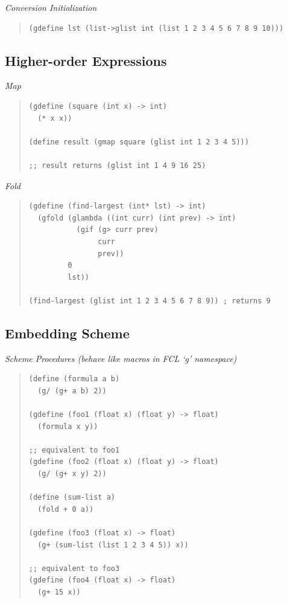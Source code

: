 \documentclass{article}
\begin{document}
\raggedright{} {
{\emph{Conversion Initialization}}
}

\begin{quote}
\begin{verbatim}
(gdefine lst (list->glist int (list 1 2 3 4 5 6 7 8 9 10)))
\end{verbatim}
\end{quote}

\subsection{Higher-order Expressions}

{\emph{Map}}
\begin{quote}
\begin{verbatim}
(gdefine (square (int x) -> int)
  (* x x))

(define result (gmap square (glist int 1 2 3 4 5)))

;; result returns (glist int 1 4 9 16 25)

\end{verbatim}
\end{quote}

{\emph{Fold}}
\begin{quote}
\begin{verbatim}
(gdefine (find-largest (int* lst) -> int)
  (gfold (glambda ((int curr) (int prev) -> int)
           (gif (g> curr prev)
                curr
                prev))
         0
         lst))

(find-largest (glist int 1 2 3 4 5 6 7 8 9)) ; returns 9
\end{verbatim}
\end{quote}

\subsection{Embedding Scheme}

\raggedright{}{
{\emph{Scheme Procedures (behave like macros in FCL `g' namespace)}}
}

\begin{quote}
\begin{verbatim}
(define (formula a b)
  (g/ (g+ a b) 2))

(gdefine (foo1 (float x) (float y) -> float)
  (formula x y))

;; equivalent to foo1
(gdefine (foo2 (float x) (float y) -> float)
  (g/ (g+ x y) 2))

(define (sum-list a)
  (fold + 0 a))

(gdefine (foo3 (float x) -> float)
  (g+ (sum-list (list 1 2 3 4 5)) x))

;; equivalent to foo3
(gdefine (foo4 (float x) -> float)
  (g+ 15 x))
\end{verbatim}
\end{quote}
\end{document}
